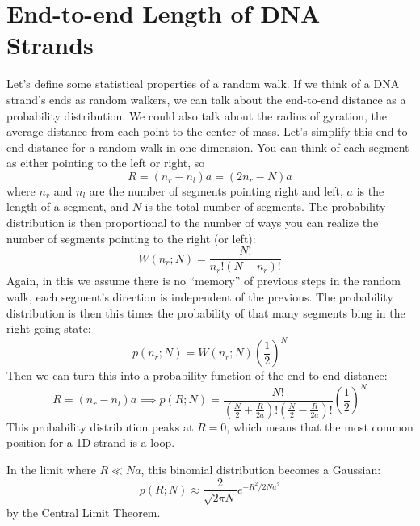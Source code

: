 \documentclass[a4paper,twoside,master.tex]{subfiles}
\begin{document}

\section{End-to-end Length of DNA Strands}\label{sec:end-to-end_length_of_dna_strands}

Let's define some statistical properties of a random walk. If we think of a DNA strand's ends as random walkers, we can talk about the end-to-end distance as a probability distribution. We could also talk about the radius of gyration, the average distance from each point to the center of mass. Let's simplify this end-to-end distance for a random walk in one dimension. You can think of each segment as either pointing to the left or right, so
\begin{equation}
    R = (n_r - n_l)a = (2n_r - N)a
\end{equation}
where $ n_r $ and $ n_l $ are the number of segments pointing right and left, $ a $ is the length of a segment, and $ N $ is the total number of segments. The probability distribution is then proportional to the number of ways you can realize the number of segments pointing to the right (or left):
\begin{equation}
    W(n_r;N) = \frac{N!}{n_r!(N - n_r)!}
\end{equation}
Again, in this we assume there is no ``memory'' of previous steps in the random walk, each segment's direction is independent of the previous. The probability distribution is then this times the probability of that many segments bing in the right-going state:
\begin{equation}
    p(n_r; N) = W(n_r ; N) \left( \frac{1}{2} \right)^N
\end{equation}
Then we can turn this into a probability function of the end-to-end distance:
\begin{equation}
    R = (n_r - n_l)a \implies p(R;N) = \frac{N!}{\left( \frac{N}{2} + \frac{R}{2a} \right)!\left( \frac{N}{2} - \frac{R}{2a} \right)!} \left( \frac{1}{2} \right)^N
\end{equation}
This probability distribution peaks at $ R = 0 $, which means that the most common position for a 1D strand is a loop.

In the limit where $ R\ll Na $, this binomial distribution becomes a Gaussian:
\begin{equation}
    p(R;N) \approx \frac{2}{\sqrt{2 \pi N}} e^{- R^2 / 2Na^2}
\end{equation}
by the Central Limit Theorem.
\end{document}
